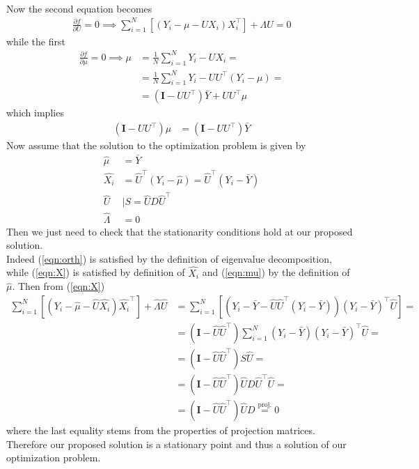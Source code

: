\documentclass[10pt,notitlepage]{article}
\newcommand{\Id}{\mathbf{I}}
\begin{document}
\begin{exercise}[Solution]
\begin{align}
        \end{align}
        Now the second equation becomes
        \begin{align}\label{eqn:X}
            \frac{\partial f}{\partial U}=0\implies \sum_{i=1}^{N}\left[\left(Y_i - \mu - U X_i\right)X_i^\top\right]+\Lambda U=0 
        \end{align}
        while the first
        \begin{align*}
            \frac{\partial f}{\partial \mu}=0\implies \mu &= \frac{1}{N}\sum_{i=1}^{N}Y_i-UX_i =\\
            &= \frac{1}{N}\sum_{i=1}^{N}Y_i- UU^\top\left(Y_i-\mu\right) = \\
            &= \left(\Id - UU^\top\right)\bar{Y} + UU^\top \mu
        \end{align*}
        which implies
        \begin{align}\label{eqn:mu}
            \left(\Id - UU^\top\right)\mu &= \left(\Id - UU^\top\right)\bar{Y}
        \end{align}
        Now assume that the solution to the optimization problem is given by
        \begin{align*}
            \hat{\mu} &= \bar{Y}\\
            \hat{X_i} &= \hat{U}^\top\left(Y_i-\hat{\mu}\right) = \hat{U}^\top\left(Y_i-\bar{Y}\right)\\
            \hat{U} &\mid S = \hat{U} D \hat{U}^\top\\
            \hat{\Lambda} &= 0
        \end{align*}
        Then we just need to check that the stationarity conditions hold at our proposed solution.\\
        Indeed (\ref{eqn:orth}) is satisfied by the definition of eigenvalue decomposition, while (\ref{eqn:X}) is satisfied by definition of $\hat{X_i}$ and (\ref{eqn:mu}) by the definition of $\hat{\mu}$.
        Then from (\ref{eqn:X}) 
        \begin{align*}
            \sum_{i=1}^{N}\left[\left(Y_i - \hat{\mu} - \hat{U} \hat{X_i}\right)\hat{X_i}^\top\right]+\hat{\Lambda} \hat{U} &= \sum_{i=1}^{N}\left[\left(Y_i - \bar{Y} - \hat{U} \hat{U}^\top\left(Y_i-\bar{Y}\right)\right)\left(Y_i-\bar{Y}\right)^\top\hat{U}\right]  =\\
            &= \left(\Id - \hat{U}\hat{U}^\top\right)\sum_{i=1}^{N}\left(Y_i - \bar{Y}\right)\left(Y_i-\bar{Y}\right)^\top \hat{U} =\\
            &= \left(\Id - \hat{U}\hat{U}^\top\right)S \hat{U} =\\
            &= \left(\Id - \hat{U}\hat{U}^\top\right) \hat{U} D \hat{U}^\top\hat{U} = \\
            &= \left(\Id - \hat{U}\hat{U}^\top\right) \hat{U} D \overset{\text{proj.}}{=} 0
        \end{align*}
        where the last equality stems from the properties of projection matrices.\\
        Therefore our proposed solution is a stationary point and thus a solution of our optimization problem.

    \end{exercise}
\end{document}
